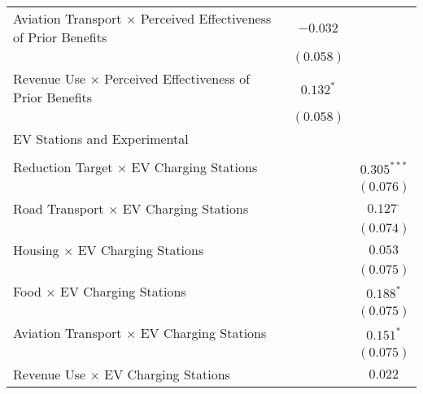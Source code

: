 \begin{center}
\begin{tiny}
\begin{longtable}{l@{} c@{} c@{}}
\quad Aviation Transport $\times$ Perceived Effectiveness of Prior Benefits & $-0.032$         &                  \\
                                                                            & $(0.058)$        &                  \\
\quad Revenue Use $\times$ Perceived Effectiveness of Prior Benefits        & $0.132^{*}$      &                  \\
                                                                            & $(0.058)$        &                  \\
EV Stations and Experimental                                                &                  &                  \\
                                                                            &                  &                  \\
\quad Reduction Target $\times$ EV Charging Stations                        &                  & $0.305^{***}$    \\
                                                                            &                  & $(0.076)$        \\
\quad Road Transport $\times$ EV Charging Stations                          &                  & $0.127^{\cdot}$  \\
                                                                            &                  & $(0.074)$        \\
\quad Housing $\times$ EV Charging Stations                                 &                  & $0.053$          \\
                                                                            &                  & $(0.075)$        \\
\quad Food $\times$ EV Charging Stations                                    &                  & $0.188^{*}$      \\
                                                                            &                  & $(0.075)$        \\
\quad Aviation Transport $\times$ EV Charging Stations                      &                  & $0.151^{*}$      \\
                                                                            &                  & $(0.075)$        \\
\quad Revenue Use $\times$ EV Charging Stations                             &                  & $0.022$          \\

\end{longtable}
\end{tiny}
\end{center}
